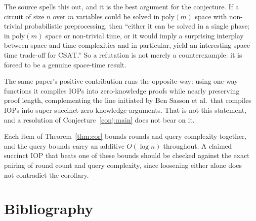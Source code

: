 \documentclass{aicr-conjecture}
\newcommand{\CSAT}{\mathrm{CSAT}}
\begin{document}
\begin{remark}\label{rem:refutation}
The source spells this out, and it is the best argument for the
conjecture. If a circuit of size $n$ over $m$ variables could be solved
in $\mathrm{poly}(m)$ space with non-trivial probabilistic preprocessing,
then ``either it can be solved in a single phase; in $\mathrm{poly}(m)$
space or non-trivial time, or it would imply a surprising interplay
between space and time complexities and in particular, yield an
interesting space-time trade-off for $\CSAT$.'' So a refutation is not
merely a counterexample: it is forced to be a genuine space-time result.
\end{remark}

\begin{remark}\label{rem:positive}
The same paper's positive contribution runs the opposite way: using
one-way functions it compiles IOPs into zero-knowledge proofs while
nearly preserving proof length, complementing the line initiated by Ben
Sasson et al.\ that compiles IOPs into super-succinct zero-knowledge
arguments. That is not this statement, and a resolution of
Conjecture~\ref{conj:main} does not bear on it.
\end{remark}

\begin{remark}\label{rem:queries}
Each item of Theorem~\ref{thm:cor} bounds rounds and query complexity
together, and the query bounds carry an additive $O(\log n)$ throughout.
A claimed succinct IOP that beats one of these bounds should be checked
against the exact pairing of round count and query complexity, since
loosening either alone does not contradict the corollary.
\end{remark}

\section{Bibliography}
\end{document}
